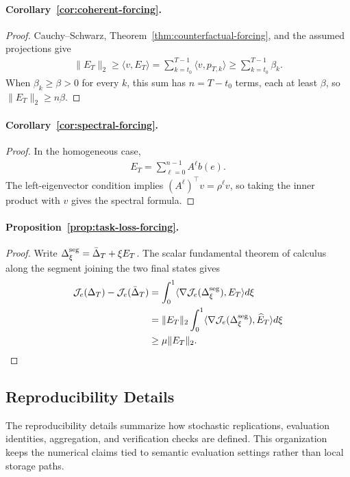 \documentclass[letterpaper]{article} %
\newcommand{\norm}[1]{\lVert#1\rVert}
\theoremstyle{remark}
\begin{document}
\paragraph{Corollary~\ref{cor:coherent-forcing}.}
\begin{proof}
	Cauchy--Schwarz, Theorem~\ref{thm:counterfactual-forcing}, and the assumed projections give
	\begin{align*}
		\norm{E_T}_2
		\geq\langle v,E_T\rangle
		=\sum_{k=t_0}^{T-1}\langle v,p_{T,k}\rangle
		\geq\sum_{k=t_0}^{T-1}\beta_k.
	\end{align*}
	When $\beta_k\geq\beta>0$ for every $k$, this sum has $n=T-t_0$ terms, each at least $\beta$, so $\norm{E_T}_2\geq n\beta$.
\end{proof}

\paragraph{Corollary~\ref{cor:spectral-forcing}.}
\begin{proof}
	In the homogeneous case,
	\begin{align*}
		E_T=\sum_{\ell=0}^{n-1}A^\ell b(e).
	\end{align*}
	The left-eigenvector condition implies $(A^\ell)^\top v=\rho^\ell v$, so taking the inner product with $v$ gives the spectral formula.
\end{proof}

\paragraph{Proposition~\ref{prop:task-loss-forcing}.}
\begin{proof}
	Write $\Delta_\xi^{\rm seg}=\bar\Delta_T+\xi E_T$.  The scalar fundamental theorem of calculus along the segment joining the two final states gives
	\begin{align*}
		\mathcal J_e(\Delta_T)-\mathcal J_e(\bar\Delta_T)
		 & =\int_0^1
		\langle\nabla\mathcal J_e(\Delta_\xi^{\rm seg}),E_T\rangle d\xi          \\
		 & =\norm{E_T}_2\int_0^1
		\langle\nabla\mathcal J_e(\Delta_\xi^{\rm seg}),\widehat E_T\rangle d\xi \\
		 & \geq\mu\norm{E_T}_2.
	\end{align*}
\end{proof}

\subsection{Reproducibility Details}
The reproducibility details summarize how stochastic replications, evaluation identities, aggregation, and verification checks are defined.  This organization keeps the numerical claims tied to semantic evaluation settings rather than local storage paths.
\end{document}
